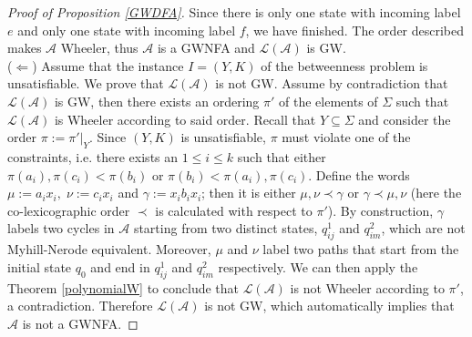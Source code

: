 \documentclass[runningheads]{llncs}
\newcommand{\tocheck}[1]{{\color{blue} #1}}
\newcommand{\la}[1]{\mathcal L(\mathcal #1)}
\begin{document}
\begin{proof}[\noindent Proof of Proposition \ref{GWDFA}]
Since there is only one state with incoming label $e$ and only one state with incoming label $f$, we have finished. The order described makes $\mathcal A$ Wheeler, thus $\mathcal A$ is a GWNFA and $\la A$ is GW. %
\\($\Longleftarrow$) Assume that the instance $I=(Y,K)$ of the betweenness problem is unsatisfiable. We prove that $\la A$ is not GW. Assume by contradiction that $\la A$ is GW, then there exists an ordering $\pi'$ of the elements of $\Sigma$ such that $\la A$ is Wheeler according to said order. Recall that $Y\subseteq\Sigma$ and consider the order $\pi:=\left. \pi' \right|_{Y}$. Since $(Y,K)$ is unsatisfiable, $\pi$ must violate one of the constraints, i.e. there exists an $1\le i\le k$ such that either $\pi(a_i),\pi(c_i)<\pi(b_i)$ or $\pi(b_i)<\pi(a_i),\pi(c_i)$. Define the words $\mu:=a_ix_i,\; \nu:=c_ix_i$ and $\gamma:=x_ib_ix_i$; then it is either $\mu,\nu\prec\gamma$ or $\gamma\prec\mu,\nu$ (here the co-lexicographic order $\prec$ is calculated with respect to $\pi'$). By construction, $\gamma$ labels two cycles in $\mathcal A$ %
starting from two distinct states, $q_{ij}^1$ and $q_{im}^2$, which are not Myhill-Nerode equivalent. Moreover, $\mu$ and $\nu$ label two paths that start from the initial state $q_0$ and end in $q_{ij}^1$ and $q_{im}^2$ respectively. We can then apply the Theorem \ref{polynomialW} to conclude that $\la A$ is not Wheeler according to $\pi'$, a contradiction. Therefore $\la A$ is not GW, which automatically implies that $\mathcal A$ is not a GWNFA.
\end{proof}





\end{document}

